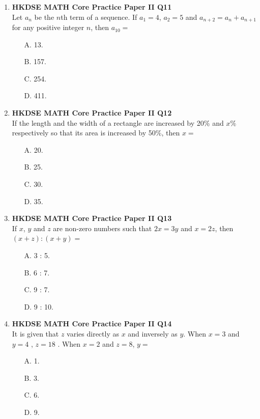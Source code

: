 \documentclass[12pt]{article}
\begin{document}
\begin{enumerate}
	\item \textbf{HKDSE MATH Core Practice Paper II Q11}\\
	Let $a_n$ be the $n$th term of a sequence. If $a_1 = 4$, $a_2 = 5$ and $a_{n + 2} = a_n + a_{n + 1}$ for any positive integer $n$, then $a_{10} = $
	\begin{enumerate}
		\item[A.] 13.
		\item[B.] 157.
		\item[C.] 254.
		\item[D.] 411.
	\end{enumerate}

	\item \textbf{HKDSE MATH Core Practice Paper II Q12}\\
	If the length and the width of a rectangle are increased by 20\% and $x\%$ respectively so that its area is increased by 50\%, then $x = $
	\begin{enumerate}
		\item[A.] 20.
		\item[B.] 25.
		\item[C.] 30.
		\item[D.] 35.
	\end{enumerate}

	\item \textbf{HKDSE MATH Core Practice Paper II Q13}\\
	If $x$, $y$ and $z$ are non-zero numbers such that $2x = 3y$ and $x = 2z$, then $(x + z) : (x + y) = $
	\begin{enumerate}
		\item[A.] 3 : 5.
		\item[B.] 6 : 7.
		\item[C.] 9 : 7.
		\item[D.] 9 : 10.
	\end{enumerate}

	\item \textbf{HKDSE MATH Core Practice Paper II Q14}\\
	It is given that $z$ varies directly as $x$ and inversely as $y$. When $x = 3$ and $y = 4$ , $z = 18$ . When $x = 2$ and $z = 8$, $y = $
	\begin{enumerate}
		\item[A.] 1.
		\item[B.] 3.
		\item[C.] 6.
		\item[D.] 9.
	\end{enumerate}


\end{enumerate}
\end{document}
